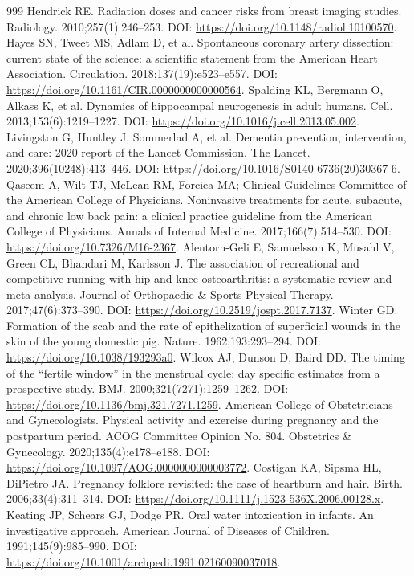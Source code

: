 \documentclass[11pt,oneside]{book}
\begin{document}
\begin{thebibliography}{999}
Hendrick RE. Radiation doses and cancer risks from breast imaging studies. Radiology. 2010;257(1):246--253. DOI: \url{https://doi.org/10.1148/radiol.10100570}.
Hayes SN, Tweet MS, Adlam D, et al. Spontaneous coronary artery dissection: current state of the science: a scientific statement from the American Heart Association. Circulation. 2018;137(19):e523--e557. DOI: \url{https://doi.org/10.1161/CIR.0000000000000564}.
Spalding KL, Bergmann O, Alkass K, et al. Dynamics of hippocampal neurogenesis in adult humans. Cell. 2013;153(6):1219--1227. DOI: \url{https://doi.org/10.1016/j.cell.2013.05.002}.
Livingston G, Huntley J, Sommerlad A, et al. Dementia prevention, intervention, and care: 2020 report of the Lancet Commission. The Lancet. 2020;396(10248):413--446. DOI: \url{https://doi.org/10.1016/S0140-6736(20)30367-6}.
Qaseem A, Wilt TJ, McLean RM, Forciea MA; Clinical Guidelines Committee of the American College of Physicians. Noninvasive treatments for acute, subacute, and chronic low back pain: a clinical practice guideline from the American College of Physicians. Annals of Internal Medicine. 2017;166(7):514--530. DOI: \url{https://doi.org/10.7326/M16-2367}.
Alentorn-Geli E, Samuelsson K, Musahl V, Green CL, Bhandari M, Karlsson J. The association of recreational and competitive running with hip and knee osteoarthritis: a systematic review and meta-analysis. Journal of Orthopaedic \& Sports Physical Therapy. 2017;47(6):373--390. DOI: \url{https://doi.org/10.2519/jospt.2017.7137}.
Winter GD. Formation of the scab and the rate of epithelization of superficial wounds in the skin of the young domestic pig. Nature. 1962;193:293--294. DOI: \url{https://doi.org/10.1038/193293a0}.
Wilcox AJ, Dunson D, Baird DD. The timing of the ``fertile window'' in the menstrual cycle: day specific estimates from a prospective study. BMJ. 2000;321(7271):1259--1262. DOI: \url{https://doi.org/10.1136/bmj.321.7271.1259}.
American College of Obstetricians and Gynecologists. Physical activity and exercise during pregnancy and the postpartum period. ACOG Committee Opinion No. 804. Obstetrics \& Gynecology. 2020;135(4):e178--e188. DOI: \url{https://doi.org/10.1097/AOG.0000000000003772}.
Costigan KA, Sipsma HL, DiPietro JA. Pregnancy folklore revisited: the case of heartburn and hair. Birth. 2006;33(4):311--314. DOI: \url{https://doi.org/10.1111/j.1523-536X.2006.00128.x}.
Keating JP, Schears GJ, Dodge PR. Oral water intoxication in infants. An investigative approach. American Journal of Diseases of Children. 1991;145(9):985--990. DOI: \url{https://doi.org/10.1001/archpedi.1991.02160090037018}.

\end{thebibliography}
\end{document}
